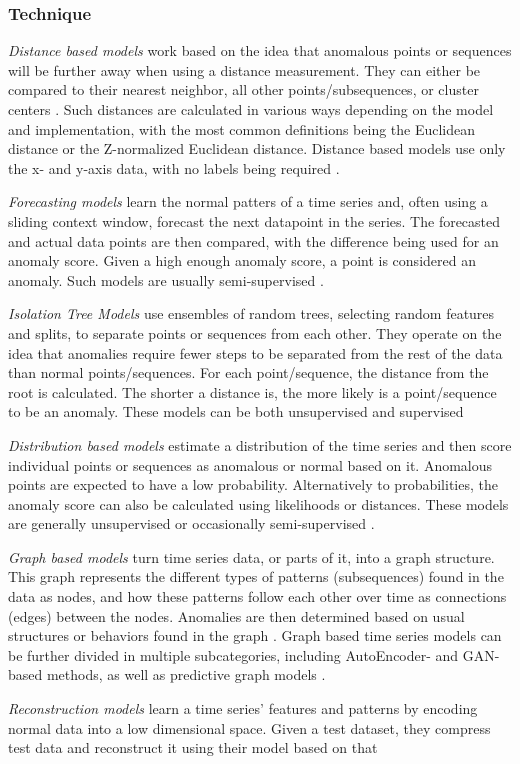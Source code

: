 \documentclass[12pt,oneside]{article}
\begin{document}
\subsubsection{Technique} \textit{Distance based models} work based on the idea that anomalous points or sequences will be further away when using a distance measurement. They can either be compared to their nearest neighbor, all other points/subsequences, or cluster centers \parencites[p.~6]{SchmidlEtAl2022Anomaly}. Such distances are calculated in various ways depending on the model and implementation, with the most common definitions being the Euclidean distance or the Z-normalized Euclidean distance. Distance based models use only the x- and y-axis data, with no labels being required \parencites[p.~8]{boniol2024divetimeseriesanomalydetection}. \par \textit{Forecasting models} learn the normal patters of a time series and, often using a sliding context window, forecast the next datapoint in the series. The forecasted and actual data points are then compared, with the difference being used for an anomaly score. Given a high enough anomaly score, a point is considered an anomaly. Such models are usually semi-supervised \parencites[p.~4-5]{SchmidlEtAl2022Anomaly}. \par \textit{Isolation Tree Models} use ensembles of random trees, selecting random features and splits, to separate points or sequences from each other. They operate on the idea that anomalies require fewer steps to be separated from the rest of the data than normal points/sequences. For each point/sequence, the distance from the root is calculated. The shorter a distance is, the more likely is a point/sequence to be an anomaly. These models can be both unsupervised and supervised \parencites[p.~6-7]{SchmidlEtAl2022Anomaly} \par \textit{Distribution based models} estimate a distribution of the time series and then score individual points or sequences as anomalous or normal based on it. Anomalous points are expected to have a low probability. Alternatively to probabilities, the anomaly score can also be calculated using likelihoods or distances. These models are generally unsupervised or occasionally semi-supervised \parencites[p.~6]{SchmidlEtAl2022Anomaly}. \par \textit{Graph based models} turn time series data, or parts of it, into a graph structure. This graph represents the different types of patterns (subsequences) found in the data as nodes, and how these patterns follow each other over time as connections (edges) between the nodes. Anomalies are then determined based on usual structures or behaviors found in the graph \parencites[p.~23-24]{boniol2024divetimeseriesanomalydetection}. Graph based time series models can be further divided in multiple subcategories, including AutoEncoder- and GAN-based methods, as well as predictive graph models \parencite{ho2025graphanomalydetectiontime}. \par \textit{Reconstruction models} learn a time series' features and patterns by encoding normal data into a low dimensional space. Given a test dataset, they compress test data and reconstruct it using their model based on that 
\end{document}
